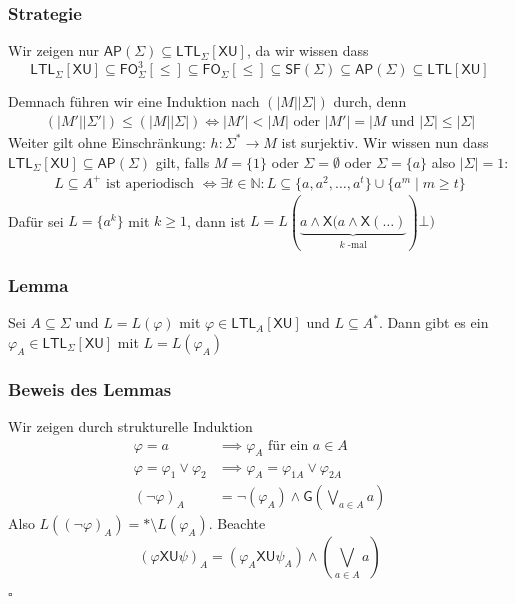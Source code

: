 \documentclass[12pt, german]{article}
\newcommand{\N}{\mathbb{N}}
\newcommand{\sigstern}{\Sigma^\ast}
\newcommand{\starfree}{\mathsf{SF}}
\newcommand{\aast}{A^{\ast}}
\newcommand{\fo}{\mathsf{FO}}
\newcommand{\ap}{\mathsf{AP}}
\newcommand{\ltl}{\mathsf{LTL}}
\newcommand{\sX}{\mathsf{X}}
\newcommand{\sG}{\mathsf{G}}
\newcommand{\sU}{\mathsf{U}}
\newcommand{\bewiesen}{
	
	\begin{flushright}
		$\square$  \\
\end{flushright}}
\begin{document}
\subsubsection{Strategie}
 Wir zeigen nur $\ap(\Sigma) \subseteq \ltl_\Sigma[\sX\sU]$, da wir wissen dass $$\ltl_\Sigma[\sX\sU] \subseteq \fo_\Sigma^3[\leq] \subseteq \fo_\Sigma[\leq] \subseteq \starfree(\Sigma) \subseteq \ap(\Sigma)\subseteq \ltl[\sX \sU] $$

 Demnach führen wir eine Induktion nach $(|M||\Sigma|)$ durch, denn 
 \begin{align*}
	 (|M'||\Sigma'|) \leq (|M||\Sigma|) \iff  |M'|<|M| \text{ oder } |M'|=|M \text{ und } |\Sigma|\leq |\Sigma|
 \end{align*}
 Weiter gilt ohne Einschränkung: $h:\sigstern \to M$ ist surjektiv. 
 Wir wissen nun dass $\ltl_\Sigma[\sX\sU] \subseteq \ap(\Sigma)$ gilt, falls $M=\{1\}$ oder $\Sigma = \emptyset$ oder $\Sigma = \{a\}$ also $|\Sigma| = 1$: 
 	\begin{align*}
 		L \subseteq A^+ \text{ ist aperiodisch } \iff \exists t \in \N: L \subseteq \{a, a^2, \ldots, a^t\} \cup \{a^m \mid  m \geq t\}
 	\end{align*}
 	Dafür sei $L=\{a^k\}$ mit $k \geq 1$, dann ist $L = L(\underbrace{a \land \sX(a \land \sX(\ldots)}_{\substack{k\text{ -mal}}})\bot)$
 	
\subsubsection{Lemma}
	Sei $A\subseteq \Sigma$ und $L = L(\varphi)$ mit $\varphi \in \ltl_A[\sX\sU]$ und $L \subseteq \aast$. Dann gibt es ein $\varphi_A \in \ltl_\Sigma[\sX\sU]$ mit $L=L(\varphi_A)$

\subsubsection{Beweis des Lemmas}
	Wir zeigen durch strukturelle Induktion
	\begin{align*}
		\varphi = a &\implies\varphi_A \text{ für ein } a \in A \\
		\varphi = \varphi_{1} \lor \varphi_{2} &\implies \varphi_{A} = \varphi_{1A} \lor \varphi_{2A} \\
		(\neg \varphi)_A &= \neg (\varphi_{A}) \land \sG(\bigvee_{a \in A}a)
	\end{align*} Also $L((\neg\varphi)_A) = \ast \setminus L(\varphi_{A})$. Beachte $$(\varphi \sX \sU \psi)_A = (\varphi_{A} \sX \sU \psi_A) \land (\bigvee_{a \in A} a)$$
	\bewiesen
	
\end{document}
